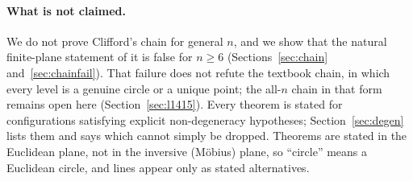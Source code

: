 \documentclass[11pt]{article}
\theoremstyle{definition}
\theoremstyle{remark}
\begin{document}
\paragraph{What is not claimed.} We do not prove Clifford's chain for general $n$, and we show that
the natural finite-plane statement of it is false for $n\ge6$ (Sections~\ref{sec:chain}
and~\ref{sec:chainfail}). That failure does not refute the textbook chain, in which every level is a
genuine circle or a unique point; the all-$n$ chain in that form remains open here
(Section~\ref{sec:l1415}). Every theorem is stated for configurations satisfying explicit
non-degeneracy hypotheses; Section~\ref{sec:degen} lists them and says which cannot simply be dropped.
Theorems are stated in the Euclidean plane, not in the inversive (M\"obius) plane, so ``circle'' means
a Euclidean circle, and lines appear only as stated alternatives.
\end{document}
